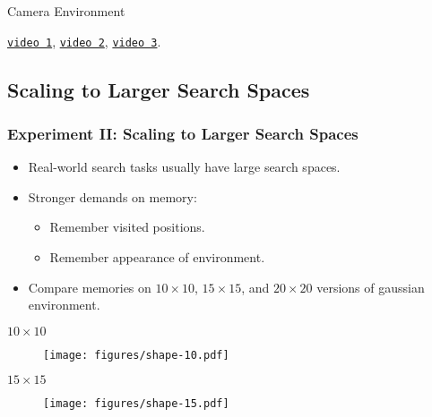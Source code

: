 \begin{frame}
    \begin{table}
        \centering
        Camera Environment\par\vspace{0.5em}
        
    \end{table}

    \begin{center}
        \href{run:./videos/camera/lstm/1000.mp4}{\texttt{video 1}},
        \href{run:./videos/camera/lstm/500.mp4}{\texttt{video 2}},
        \href{run:./videos/camera/lstm/1.mp4}{\texttt{video 3}}.
    \end{center}
\end{frame}

\subsection{Scaling to Larger Search Spaces}

\begin{frame}
    \frametitle{Experiment II: Scaling to Larger Search Spaces}

    \begin{itemize}
        \item Real-world search tasks usually have large search spaces.
        \item Stronger demands on memory:
        \begin{itemize}
            \item Remember visited positions.
            \item Remember appearance of environment.
        \end{itemize}
        \item Compare memories on \(10 \times 10\), \(15 \times 15\), and \(20 \times 20\) versions of gaussian environment.
    \end{itemize}
\end{frame}

\begin{frame}
    \begin{center}
        \(10 \times 10\)
        \begin{figure}
            \texttt{[image: figures/shape-10.pdf]}
        \end{figure}
    \end{center}
\end{frame}

\begin{frame}
    \begin{center}
        \(15 \times 15\)
        \begin{figure}
            \texttt{[image: figures/shape-15.pdf]}
        \end{figure}
    \end{center}
\end{frame}


